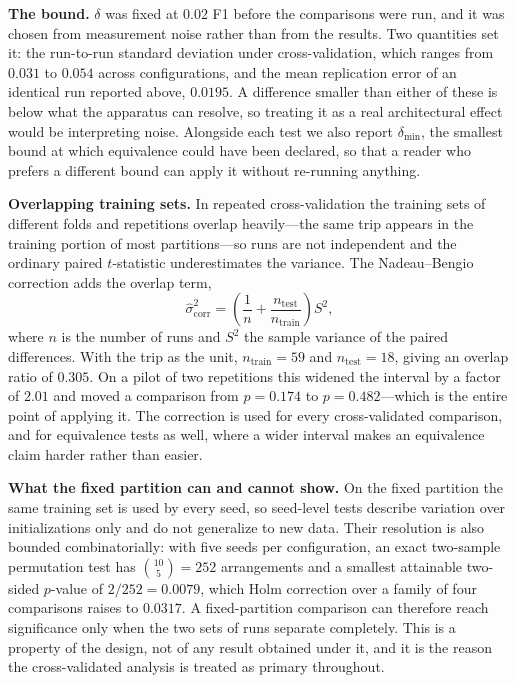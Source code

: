 \documentclass[journal]{IEEEtran}
\begin{document}
\textbf{The bound.} $\delta$ was fixed at $0.02$ F1 before the comparisons were
run, and it was chosen from measurement noise rather than from the results.
Two quantities set it: the run-to-run standard deviation under
cross-validation, which ranges from $0.031$ to $0.054$ across configurations,
and the mean replication error of an identical run reported above, $0.0195$.
A difference smaller than either of these is below what the apparatus can
resolve, so treating it as a real architectural effect would be interpreting
noise. Alongside each test we also report $\delta_{\min}$, the smallest bound
at which equivalence could have been declared, so that a reader who prefers a
different bound can apply it without re-running anything.

\textbf{Overlapping training sets.} In repeated cross-validation the training
sets of different folds and repetitions overlap heavily---the same trip appears
in the training portion of most partitions---so runs are not independent and
the ordinary paired $t$-statistic underestimates the variance. The
Nadeau--Bengio correction adds the overlap term,
\begin{equation}
  \hat{\sigma}^2_{\mathrm{corr}} = \left(\frac{1}{n} + \frac{n_{\mathrm{test}}}{n_{\mathrm{train}}}\right) S^2 ,
  \label{eq:nadeau_bengio}
\end{equation}
where $n$ is the number of runs and $S^2$ the sample variance of the paired
differences. With the trip as the unit, $n_{\mathrm{train}} = 59$ and
$n_{\mathrm{test}} = 18$, giving an overlap ratio of $0.305$. On a pilot of two
repetitions this widened the interval by a factor of $2.01$ and moved a
comparison from $p = 0.174$ to $p = 0.482$---which is the entire point of
applying it. The correction is used for every cross-validated comparison, and
for equivalence tests as well, where a wider interval makes an equivalence
claim harder rather than easier.

\textbf{What the fixed partition can and cannot show.} On the fixed partition
the same training set is used by every seed, so seed-level tests describe
variation over initializations only and do not generalize to new data. Their
resolution is also bounded combinatorially: with five seeds per configuration,
an exact two-sample permutation test has $\binom{10}{5} = 252$ arrangements
and a smallest attainable two-sided $p$-value of $2/252 = 0.0079$, which Holm
correction over a family of four comparisons raises to $0.0317$. A
fixed-partition comparison can therefore reach significance only when the two
sets of runs separate completely. This is a property of the design, not of any
result obtained under it, and it is the reason the cross-validated analysis is
treated as primary throughout.
\end{document}
